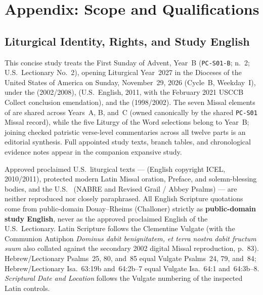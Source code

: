 \section{Appendix: Scope and Qualifications}

\subsection{Liturgical Identity, Rights, and Study English}
This concise study treats the First Sunday of Advent, Year~B (\texttt{PC-S01-B};  n.~2; U.S.\ Lectionary No.~2), opening Liturgical Year~2027 in the Dioceses of the United States of America on Sunday, November~29, 2026 (Cycle~B, Weekday~I), under the  (2002/2008),  (U.S.\ English, 2011, with the February 2021 USCCB Collect conclusion emendation), and the  (1998/2002). The seven Missal elements of  are shared across Years~A, B, and~C (owned canonically by the shared \texttt{PC-S01} Missal record), while the five Liturgy of the Word selections belong to Year~B; joining checked patristic verse-level commentaries across all twelve parts is an editorial synthesis. Full appointed study texts, branch tables, and chronological evidence notes appear in the companion expansive study.

Approved proclaimed U.S.\ liturgical texts ---  (English copyright ICEL, 2010/2011), protected modern Latin Missal oration, Preface, and solemn-blessing bodies, and the U.S.\  (NABRE and Revised Grail / Abbey Psalms) --- are neither reproduced nor closely paraphrased. All English Scripture quotations come from public-domain Douay--Rheims (Challoner) strictly as \textbf{public-domain study English}, never as the approved proclaimed English of the U.S.\ Lectionary. Latin Scripture follows the Clementine Vulgate (with the Communion Antiphon \emph{Dominus dabit benignitatem, et terra nostra dabit fructum suum} also collated against the secondary 2002 digital Missal reproduction, p.~83). Hebrew/Lectionary Psalms~25, 80, and~85 equal Vulgate Psalms~24, 79, and~84; Hebrew/Lectionary Isa.~63:19b and~64:2b--7 equal Vulgate Isa.~64:1 and~64:3b--8. \emph{Scriptural Date and Location} follows the Vulgate numbering of the inspected Latin controls.

